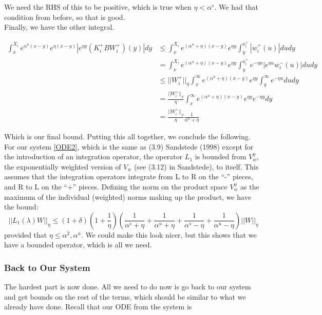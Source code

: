 \documentclass[12pt]{article}
\begin{document}
We need the RHS of this to be positive, which is true when $\eta < \alpha^s$. We had that condition from before, so that is good.\\

Finally, we have the other integral.

\begin{align*}
\int_x^{X_i} e^{\alpha^u (x-y)}e^{\eta(x-y)}|e^{\eta y} (K_i^+ B W_i^+)(y)| dy &\leq \int_x^{X_i} e^{(\alpha^u + \eta)(x-y)}e^{\eta y} \int_y^{a_i^+} |w_i^+(u)| du dy \\
&= \int_x^{X_i} e^{(\alpha^u + \eta)(x-y)}e^{\eta y} \int_y^{a_i^+} e^{-\eta u} |e^{\eta u} w_i^-(u)| du dy \\
&\leq ||W_i^+||_\eta \int_x^\infty e^{(\alpha^u + \eta)(x-y)}e^{\eta y} \int_y^\infty e^{-\eta u} du dy \\
&= \frac{||W_i^+||_\eta}{\eta} \int_x^\infty e^{(\alpha^u + \eta)(x-y)}e^{\eta y} e^{-\eta y} dy \\
&= \frac{||W_i^+||_\eta}{\eta} \frac{1}{\alpha^u + \eta}
\end{align*}

Which is our final bound. Putting this all together, we conclude the following.\\

For our system \eqref{ODE2}, which is the same as (3.9) Sandstede (1998) except for the introduction of an integration operator, the operator $L_1$ is bounded from $V_w^\eta$, the exponentially weighted version of $V_w$ (see (3.12) in Sandstede), to itself. This assumes that the integration operators integrate from L to R on the ``-'' pieces, and R to L on the ``+'' pieces. Defining the norm on the product space $V_w^\eta$ as the maximum of the individual (weighted) norms making up the product, we have the bound:
\begin{equation}
	||L_1(\lambda)W||_\eta \leq (1 + \delta)\left(1 + \frac{1}{\eta}\right)\left(\frac{1}{\alpha^s + \eta} + \frac{1}{\alpha^u + \eta} + \frac{1}{\alpha^s - \eta} + \frac{1}{\alpha^u - \eta}\right)||W||_\eta
\end{equation}
provided that $\eta \leq \alpha^2, \alpha^u$. We could make this look nicer, but this shows that we have a bounded operator, which is all we need.

\subsubsection*{Back to Our System}
The hardest part is now done. All we need to do now is go back to our system and get bounds on the rest of the terms, which should be similar to what we already have done. Recall that our ODE from the system is
\end{document}

